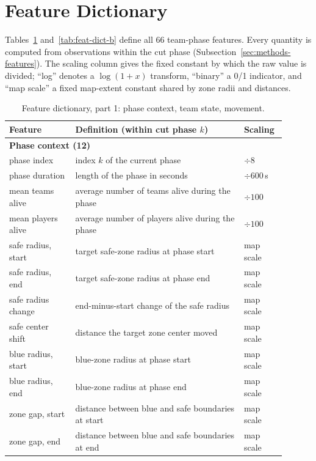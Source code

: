 \section{Feature Dictionary}
\label{app:features}

Tables~\ref{tab:feat-dict-a} and~\ref{tab:feat-dict-b} define all 66
team-phase features. Every quantity is computed from observations within the
cut phase (Subsection~\ref{sec:methods-features}). The scaling column gives
the fixed constant by which the raw value is divided; ``log'' denotes a
\(\log(1{+}x)\) transform, ``binary'' a 0/1 indicator, and ``map scale'' a
fixed map-extent constant shared by zone radii and distances.

\begin{table}[t]
\centering
\caption{Feature dictionary, part 1: phase context, team state, movement.}
\label{tab:feat-dict-a}
\footnotesize
\begin{tabular}{p{0.22\linewidth}p{0.56\linewidth}p{0.12\linewidth}}
\toprule
Feature & Definition (within cut phase \(k\)) & Scaling \\
\midrule
\multicolumn{3}{l}{\textbf{Phase context (12)}} \\
phase index & index \(k\) of the current phase & \(\div 8\) \\
phase duration & length of the phase in seconds & \(\div 600\)\,s \\
mean teams alive & average number of teams alive during the phase & \(\div 100\) \\
mean players alive & average number of players alive during the phase & \(\div 100\) \\
safe radius, start & target safe-zone radius at phase start & map scale \\
safe radius, end & target safe-zone radius at phase end & map scale \\
safe radius change & end-minus-start change of the safe radius & map scale \\
safe center shift & distance the target zone center moved & map scale \\
blue radius, start & blue-zone radius at phase start & map scale \\
blue radius, end & blue-zone radius at phase end & map scale \\
zone gap, start & distance between blue and safe boundaries at start & map scale \\
zone gap, end & distance between blue and safe boundaries at end & map scale \\
\midrule

\end{tabular}
\end{table}
